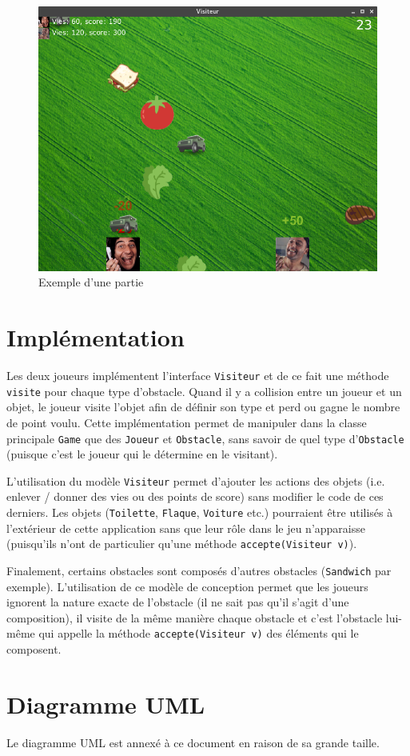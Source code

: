 \documentclass[11pt,a4paper,twoside]{article}
\begin{document}
\begin{figure}[!ht]
	\center
	\includegraphics[scale=0.5]{capture_jeu.png}
	\caption{Exemple d'une partie}
	\label{partie}
\end{figure}
\newpage

\section*{Implémentation}
Les deux joueurs implémentent l'interface \texttt{Visiteur} et de ce fait une méthode \texttt{visite} pour chaque type d'obstacle. Quand il y a collision entre un joueur et un objet, le joueur \og visite \fg l'objet afin de définir son type et perd ou gagne le nombre de point voulu. Cette implémentation permet de manipuler dans la classe principale \texttt{Game} que des \texttt{Joueur} et \texttt{Obstacle}, sans savoir de quel type d'\texttt{Obstacle} (puisque c'est le joueur qui le détermine en le visitant).

L'utilisation du modèle \texttt{Visiteur} permet d'ajouter les actions des objets (i.e. enlever / donner des vies ou des points de score) sans modifier le code de ces derniers. Les objets (\texttt{Toilette}, \texttt{Flaque}, \texttt{Voiture} etc.) pourraient être utilisés à l'extérieur de cette application sans que leur rôle dans le jeu n'apparaisse (puisqu'ils n'ont de particulier qu'une méthode \texttt{accepte(Visiteur v)}).

Finalement, certains obstacles sont composés d'autres obstacles (\texttt{Sandwich} par exemple). L'utilisation de ce modèle de conception permet que les joueurs ignorent la nature exacte de l'obstacle (il ne sait pas qu'il s'agit d'une composition), il visite de la même manière chaque obstacle et c'est l'obstacle lui-même qui appelle la méthode \texttt{accepte(Visiteur v)} des éléments qui le composent.

\section*{Diagramme UML}
Le diagramme UML est annexé à ce document en raison de sa grande taille.
\end{document}
